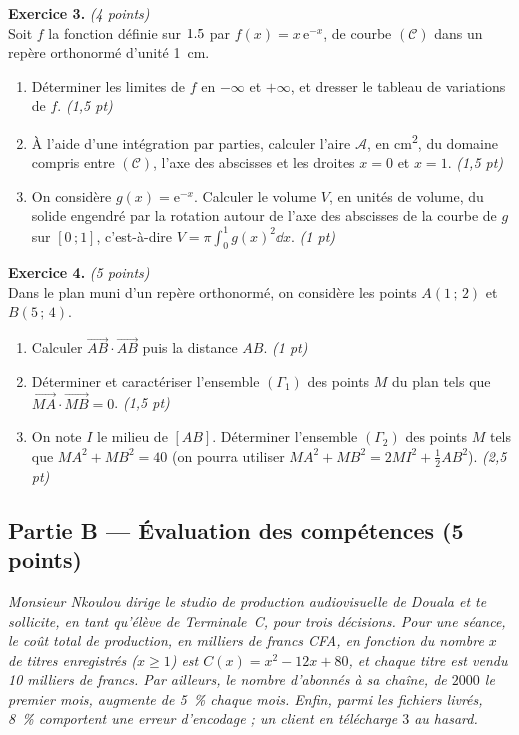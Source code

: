 \smallskip
\noindent\textbf{Exercice 3.} \hfill\textit{(4 points)}\\
Soit $f$ la fonction définie sur $1.5$ par $f(x)=x\,\mathrm{e}^{-x}$, de courbe $(\mathcal{C})$
dans un repère orthonormé d'unité \SI{1}{\centi\metre}.
\begin{enumerate}[label=\arabic*)]
\item Déterminer les limites de $f$ en $-\infty$ et $+\infty$, et dresser le tableau de
variations de $f$. \hfill\textit{(1,5 pt)}
\item À l'aide d'une intégration par parties, calculer l'aire $\mathcal{A}$, en \si{\centi\metre\squared},
du domaine compris entre $(\mathcal{C})$, l'axe des abscisses et les droites $x=0$ et $x=1$. \hfill\textit{(1,5 pt)}
\item On considère $g(x)=\mathrm{e}^{-x}$. Calculer le volume $V$, en unités de volume,
du solide engendré par la rotation autour de l'axe des abscisses de la courbe de $g$ sur
$[0\,;1]$, c'est-à-dire $V=\pi\displaystyle\int_0^1 g(x)^2\dd x$. \hfill\textit{(1 pt)}
\end{enumerate}

\smallskip
\noindent\textbf{Exercice 4.} \hfill\textit{(5 points)}\\
Dans le plan muni d'un repère orthonormé, on considère les points $A(1\,;\,2)$ et $B(5\,;\,4)$.
\begin{enumerate}[label=\arabic*)]
\item Calculer $\overrightarrow{AB}\cdot\overrightarrow{AB}$ puis la distance $AB$. \hfill\textit{(1 pt)}
\item Déterminer et caractériser l'ensemble $(\Gamma_1)$ des points $M$ du plan tels que
$\overrightarrow{MA}\cdot\overrightarrow{MB}=0$. \hfill\textit{(1,5 pt)}
\item On note $I$ le milieu de $[AB]$. Déterminer l'ensemble $(\Gamma_2)$ des points $M$
tels que $MA^2+MB^2=40$ (on pourra utiliser $MA^2+MB^2=2MI^2+\tfrac12 AB^2$). \hfill\textit{(2,5 pt)}
\end{enumerate}

\subsection*{Partie B — Évaluation des compétences \hfill (5 points)}

\noindent\textit{Monsieur Nkoulou dirige le studio de production audiovisuelle de Douala
et te sollicite, en tant qu'élève de Terminale~C, pour trois décisions. Pour une séance,
le coût total de production, en milliers de francs CFA, en fonction du nombre $x$ de
titres enregistrés ($x\ge1$) est $C(x)=x^2-12x+80$, et chaque titre est vendu
\SI{10}{} milliers de francs. Par ailleurs, le nombre d'abonnés à sa chaîne, de $2000$
le premier mois, augmente de \SI{5}{\percent} chaque mois. Enfin, parmi les fichiers
livrés, \SI{8}{\percent} comportent une erreur d'encodage ; un client en télécharge $3$
au hasard.}

